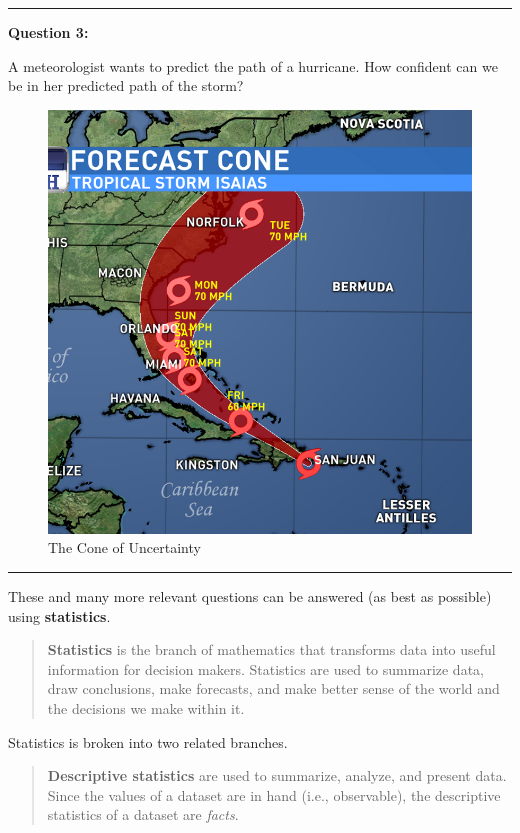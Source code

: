 \documentclass[
]{book}
\begin{document}
\begin{center}\rule{0.5\linewidth}{0.5pt}\end{center}

\textbf{Question 3:}

A meteorologist wants to predict the path of a hurricane. How confident can we be in her predicted path of the storm?

\begin{figure}

{\centering \includegraphics[width=0.7\linewidth]{images/FORECASTCONE} 

}

\caption{The Cone of Uncertainty}\label{fig:unnamed-chunk-5}
\end{figure}

\begin{center}\rule{0.5\linewidth}{0.5pt}\end{center}

These and many more relevant questions can be answered (as best as possible) using \textbf{statistics}.

\begin{quote}
\textbf{Statistics} is the branch of mathematics that transforms data into useful information for decision makers. Statistics are used to summarize data, draw conclusions, make forecasts, and make better sense of the world and the decisions we make within it.
\end{quote}

Statistics is broken into two related branches.

\begin{quote}
\textbf{Descriptive statistics} are used to summarize, analyze, and present data. Since the values of a dataset are in hand (i.e., observable), the descriptive statistics of a dataset are \emph{facts}.
\end{quote}
\end{document}

